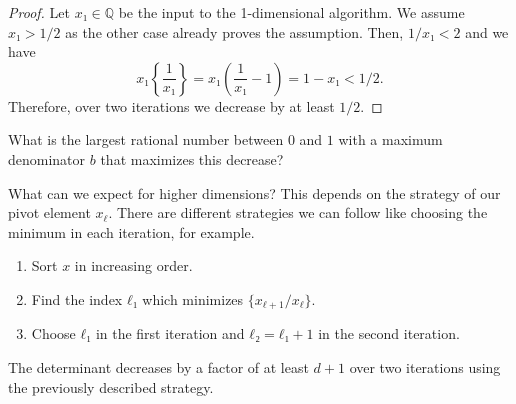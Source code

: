 \documentclass[english,version-2020-11]{uzl-thesis}
\begin{document}
\begin{proof}
  Let $x₁ ∈ ℚ$ be the input to the 1-dimensional algorithm.
  We assume $x₁ > 1/2$ as the other case already proves the assumption.
  Then, $1/x₁ < 2$ and we have
  \[
    x₁ \left\{\frac{1}{x₁}\right\}
    = x₁ \left(\frac{1}{x₁} - 1\right)
    = 1 - x₁ < 1/2.
  \]
  Therefore, over two iterations we decrease by at least $1/2$.
\end{proof}

What is the largest rational number between $0$ and $1$ with a maximum
denominator $b$ that maximizes this decrease?

What can we expect for higher dimensions?
This depends on the strategy of our pivot element $x_\ell$.
There are different strategies we can follow like choosing the minimum in each iteration, for example.

\begin{enumerate}
  \item Sort $x$ in increasing order.
  \item Find the index $ℓ₁$ which minimizes $\{x_{ℓ+1}/x_ℓ\}$.
  \item Choose $ℓ₁$ in the first iteration and $ℓ₂ = ℓ₁ + 1$ in the second iteration.
\end{enumerate}

\begin{theorem}
  The determinant decreases by a factor of at least $d+1$ over two iterations
  using the previously described strategy.
\end{theorem}
\end{document}
